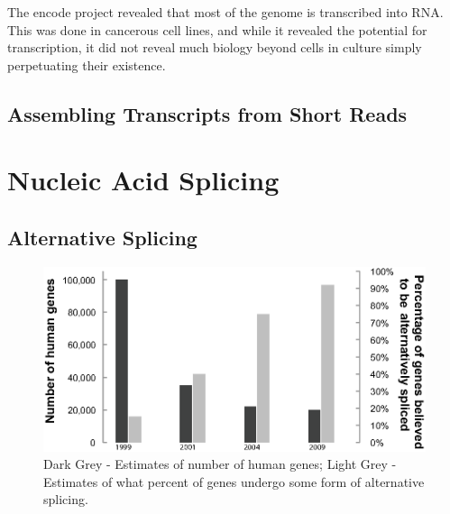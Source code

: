 
The encode project revealed that most of the genome is transcribed into RNA. This was done in cancerous cell lines, and while it revealed the potential for transcription, it did not reveal much biology beyond cells in culture simply perpetuating their existence. 

\subsection{Assembling Transcripts from Short Reads}


\section{Nucleic Acid Splicing}
\subsection{Alternative Splicing}

\citep{Kelemen2013}

\citep{Barbosa-Morais2012,Merkin2012} 


\begin{figure}[htbp]
	\centering 
	\includegraphics{Figures/Chapter1/numberHumanGenesAndNumberSpliced}
	\caption[Estimates of number of human genes, and percentage alternatively spliced over time]
	{
		Dark Grey - Estimates of number of human genes; Light Grey - Estimates of what percent of genes undergo some form of alternative splicing.
	}
	\label{fig:numGenesAndNumSpliced}
\end{figure}

